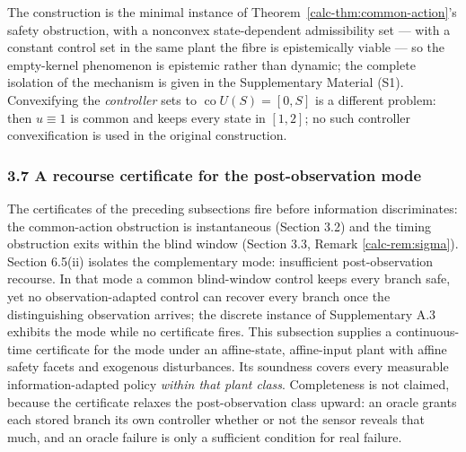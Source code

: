 \documentclass[10pt,twocolumn]{article}
\theoremstyle{definition}
\begin{document}
The construction is the minimal instance of Theorem~\ref{calc-thm:common-action}'s safety obstruction, with a nonconvex state-dependent admissibility set --- with a constant control set in the same plant the fibre is epistemically viable --- so the empty-kernel phenomenon is epistemic rather than dynamic; the complete isolation of the mechanism is given in the Supplementary Material (S1). Convexifying the \emph{controller} sets to \(\operatorname{co}U(S)=[0,S]\) is a different problem: then \(u\equiv1\) is common and keeps every state in \([1,2]\); no such controller convexification is used in the original construction.

\subsubsection{3.7 A recourse certificate for the post-observation
mode}\label{calc-recourse-certificate}

The certificates of the preceding subsections fire before information discriminates: the
common-action obstruction is instantaneous (Section 3.2) and the timing
obstruction exits within the blind window (Section 3.3, Remark
\ref{calc-rem:sigma}). Section 6.5(ii) isolates the complementary mode:
insufficient post-observation recourse. In that mode a common blind-window
control keeps every branch safe, yet no observation-adapted control can
recover every branch once the distinguishing observation arrives; the discrete
instance of Supplementary A.3 exhibits the mode while no certificate fires.
This subsection supplies a continuous-time certificate for the mode under
an affine-state, affine-input plant with affine safety facets and exogenous
disturbances. Its soundness covers every measurable information-adapted policy
\emph{within that plant class}. Completeness is
not claimed, because the certificate relaxes the post-observation class
upward: an oracle grants each stored branch its own controller whether or not
the sensor reveals that much, and an oracle failure is only a sufficient
condition for real failure.
\end{document}

